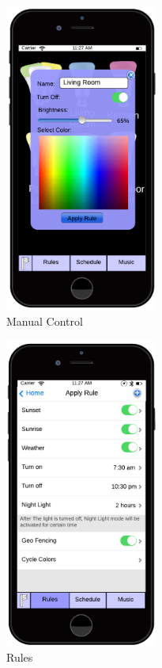 \documentclass[12pt]{article}
\begin{document}
  \begin{figure}[ht!]
    \centering
    \includegraphics[width=50mm]{ManualControl.png}
    \caption{Manual Control}
    \label{fig:singleControl}
  \end{figure}
  
  
  \begin{figure}[ht!]
    \centering
    \includegraphics[width=50mm]{ApplyRule.png}
    \caption{Rules}
    \label{fig:rules}
  \end{figure}
  
\end{document}
